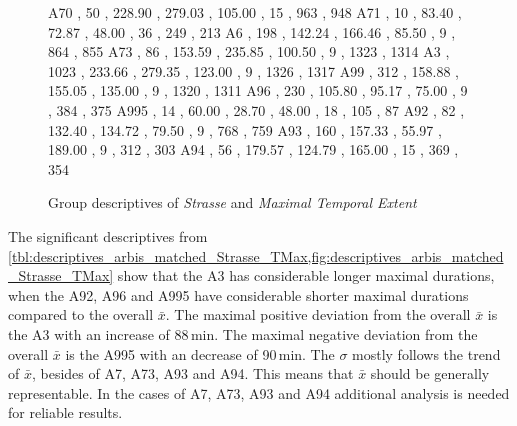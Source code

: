 \begin{figure}[ht!]
\begin{minipage}{0.55\textwidth}
{			A70  , 50   , 228.90 , 279.03 , 105.00 , 15  , 963  , 948 
			A71  , 10   , 83.40  , 72.87  , 48.00  , 36  , 249  , 213 
			A6   , 198  , 142.24 , 166.46 , 85.50  , 9   , 864  , 855 
			A73  , 86   , 153.59 , 235.85 , 100.50 , 9   , 1323 , 1314
			A3   , 1023 , 233.66 , 279.35 , 123.00 , 9   , 1326 , 1317
			A99  , 312  , 158.88 , 155.05 , 135.00 , 9   , 1320 , 1311
			A96  , 230  , 105.80 , 95.17  , 75.00  , 9   , 384  , 375 
			A995 , 14   , 60.00  , 28.70  , 48.00  , 18  , 105  , 87 
			A92  , 82   , 132.40 , 134.72 , 79.50  , 9   , 768  , 759 
			A93  , 160  , 157.33 , 55.97  , 189.00 , 9   , 312  , 303 
			A94  , 56   , 179.57 , 124.79 , 165.00 , 15  , 369  , 354 
		}\data
		\pgfplotstablesort[sort key=mean, sort cmp=float >]{\datasorted}{\data}
		\tiny
		\centering
		\label{fig:descriptives_arbis_matched_Strasse_TMax}
	\end{minipage}%
	\caption{Group descriptives of \textit{Strasse} and \textit{Maximal Temporal Extent}}
\end{figure}
The significant descriptives from \cref{tbl:descriptives_arbis_matched_Strasse_TMax,fig:descriptives_arbis_matched_Strasse_TMax} show that the A3 has considerable longer maximal durations, when the A92, A96 and A995 have considerable shorter maximal durations compared to the overall $\bar{x}$. The maximal positive deviation from the overall $\bar{x}$ is the A3 with an increase of 88\,min. The maximal negative deviation from the overall $\bar{x}$ is the A995 with an decrease of 90\,min. The $\sigma$ mostly follows the trend of $\bar{x}$, besides of A7, A73, A93 and A94. This means that $\bar{x}$ should be generally representable. In the cases of A7, A73, A93 and A94 additional analysis is needed for reliable results.
